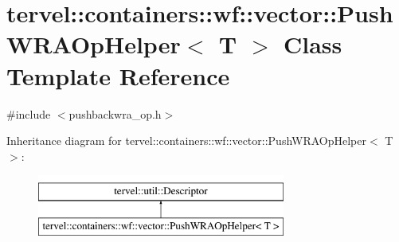 \hypertarget{classtervel_1_1containers_1_1wf_1_1vector_1_1_push_w_r_a_op_helper}{}\section{tervel\+:\+:containers\+:\+:wf\+:\+:vector\+:\+:Push\+W\+R\+A\+Op\+Helper$<$ T $>$ Class Template Reference}
\label{classtervel_1_1containers_1_1wf_1_1vector_1_1_push_w_r_a_op_helper}


{\ttfamily \#include $<$pushbackwra\+\_\+op.\+h$>$}

Inheritance diagram for tervel\+:\+:containers\+:\+:wf\+:\+:vector\+:\+:Push\+W\+R\+A\+Op\+Helper$<$ T $>$\+:\begin{figure}[H]
\begin{center}
\leavevmode
\includegraphics[height=2.000000cm]{classtervel_1_1containers_1_1wf_1_1vector_1_1_push_w_r_a_op_helper}
\end{center}
\end{figure}

